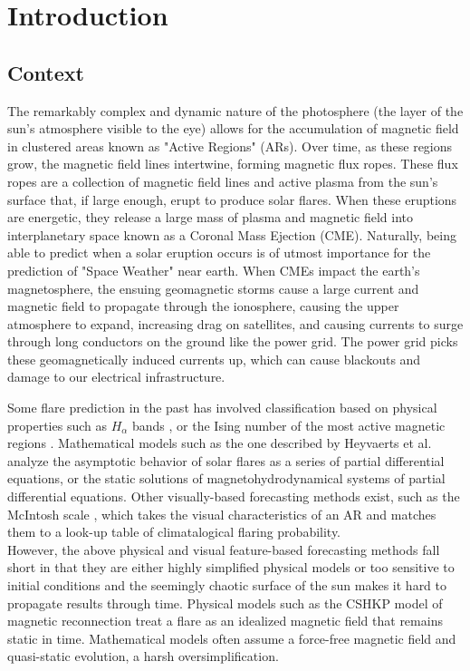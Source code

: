\chapter{Introduction}
\label{chp:introduction}

\section{Context}
The remarkably complex and dynamic nature of the photosphere (the layer of the sun's atmosphere visible to the eye) allows for the accumulation of magnetic field in clustered areas known as "Active Regions" (ARs). Over time, as these regions grow, the magnetic field lines intertwine, forming magnetic flux ropes. These flux ropes are a collection of magnetic field lines and active plasma from the sun's surface that, if large enough, erupt to produce solar flares. When these eruptions are energetic, they release a large mass of plasma and magnetic field into interplanetary space known as a Coronal Mass Ejection (CME). Naturally, being able to predict when a solar eruption occurs is of utmost importance for the prediction of "Space Weather" near earth. When CMEs impact the earth's magnetosphere, the ensuing geomagnetic storms cause a large current and magnetic field to propagate through the ionosphere, causing the upper atmosphere to expand, increasing drag on satellites, and causing currents to surge through long conductors on the ground like the power grid. The power grid picks these geomagnetically induced currents up, which can cause blackouts and damage to our electrical infrastructure. 

Some flare prediction in the past has involved classification based on physical properties such as $H_{\alpha}$ bands \cite{hale_magnetic_1919}, or the Ising number of the most active magnetic regions \cite{MCintosh}. Mathematical models such as the one described by Heyvaerts et al. \cite{heyvaerts_mathematical_1983} analyze the asymptotic behavior of solar flares as a series of partial differential equations, or the static solutions of magnetohydrodynamical systems of partial differential equations. Other visually-based forecasting methods exist, such as the McIntosh scale \cite{MCintosh}, which takes the visual characteristics of an AR and matches them to a look-up table of climatalogical flaring probability. \\

However, the above physical and visual feature-based forecasting methods fall short in that they are either highly simplified physical models or too sensitive to initial conditions and the seemingly chaotic surface of the sun makes it hard to propagate results through time. Physical models such as the CSHKP model \cite{choudhary_strassmeier_2011} of magnetic reconnection treat a flare as an idealized magnetic field that remains static in time. Mathematical models often assume a force-free magnetic field and quasi-static evolution, a harsh oversimplification.


